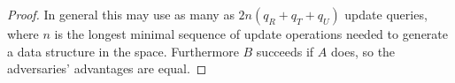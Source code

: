 {\begin{proof}
In general this may use as many as $2n(q_R+q_T+q_U)$ update queries, where $n$
is the longest minimal sequence of update operations needed to generate a data
structure in the space. Furthermore $B$ succeeds if $A$ does, so the
adversaries' advantages are equal.
%
\missingqed
\end{proof}
}
